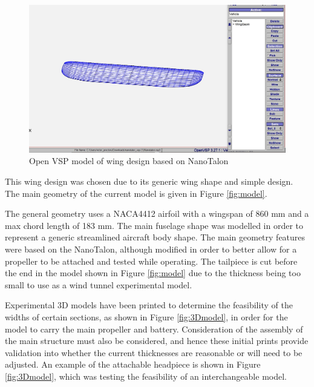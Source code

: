 \begin{figure}[H]
    \centering
    \includegraphics[width=\linewidth]{04_Progress/Figs/openVSp.JPG}
    \caption{Open \acrshort{VSP} model of wing design based on NanoTalon \cite{NanoTalon}}
    \label{fig:openVSP}
\end{figure}

This wing design was chosen due to its generic wing shape and simple design. The main geometry of the current model is given in Figure \ref{fig:model}.



The general geometry uses a NACA4412 airfoil with a wingspan of 860 mm and a max chord length of 183 mm. The main fuselage shape was modelled in order to represent a generic streamlined aircraft body shape. The main geometry features were based on the NanoTalon, although modified in order to better allow for a propeller to be attached and tested while operating. The tailpiece is cut before the end in the model shown in Figure \ref{fig:model} due to the thickness being too small to use as a wind tunnel experimental model.

Experimental 3D models have been printed to determine the feasibility of the widths of certain sections, as shown in Figure \ref{fig:3Dmodel}, in order for the model to carry the main propeller and battery. Consideration of the assembly of the main structure must also be considered, and hence these initial prints provide validation into whether the current thicknesses are reasonable or will need to be adjusted. An example of the attachable headpiece is shown in Figure \ref{fig:3Dmodel}, which was testing the feasibility of an interchangeable model. 

